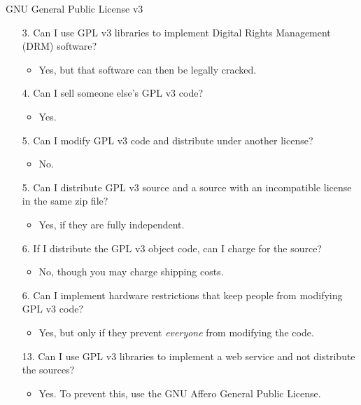 \documentclass{beamer}
\begin{document}
\begin{frame}{GNU General Public License v3 \hfill\href{http://www.gnu.org/copyleft/gpl.html}{}}
\begin{itemize}
\item[3.] Can I use GPL v3 libraries to implement Digital Rights Management (DRM) software? \\
\begin{itemize}
\item<2->Yes, but that software can then be legally cracked.
\end{itemize}
\item[4.] Can I sell someone else's GPL v3 code?
\begin{itemize}
\item<3->Yes.
\end{itemize}
\item[5.] Can I modify GPL v3 code and distribute under another license?
\begin{itemize}
\item<4-> No.
\end{itemize}
\item[5.] Can I distribute GPL v3 source and a source with an incompatible license in the same zip file?
\begin{itemize}
\item<5->Yes, if they are fully independent.
\end{itemize}
\item[6.] If I distribute the GPL v3 object code, can I charge for the source?
\begin{itemize}
\item<6-> No, though you may charge shipping costs.
\end{itemize}
\item[6.] Can I implement hardware restrictions that keep people from modifying GPL v3 code?
\begin{itemize}
\item<7-> Yes, but only if they prevent \emph{everyone} from modifying the code.
\end{itemize}
\item[13.] Can I use GPL v3 libraries to implement a web service and not distribute the sources?
\begin{itemize}
\item<8-> Yes. To prevent this, use the GNU Affero General Public License.
\end{itemize}
\end{itemize}
\end{frame}
\end{document}
